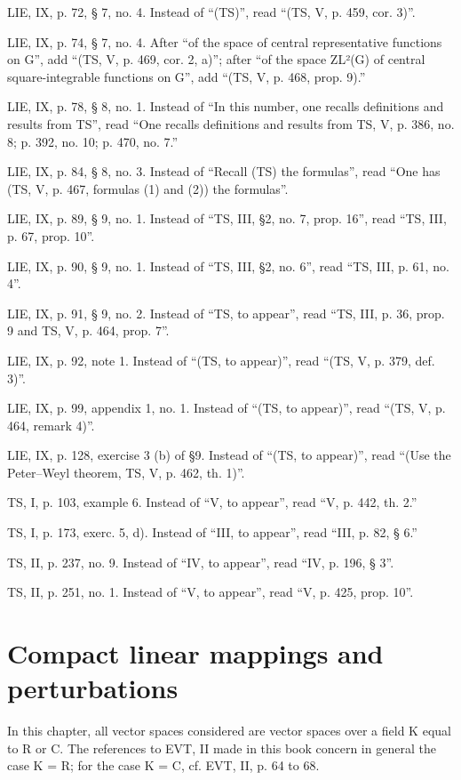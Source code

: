LIE, IX, p. 72, § 7, no. 4. Instead of “(TS)”, read “(TS, V, p. 459, cor. 3)”.

LIE, IX, p. 74, § 7, no. 4. After “of the space of central representative functions on G”, add “(TS, V, p. 469, cor. 2, a)”; after “of the space ZL²(G) of central square-integrable functions on G”, add “(TS, V, p. 468, prop. 9).”

LIE, IX, p. 78, § 8, no. 1. Instead of “In this number, one recalls definitions and results from TS”, read “One recalls definitions and results from TS, V, p. 386, no. 8; p. 392, no. 10; p. 470, no. 7.”

LIE, IX, p. 84, § 8, no. 3. Instead of “Recall (TS) the formulas”, read “One has (TS, V, p. 467, formulas (1) and (2)) the formulas”.

LIE, IX, p. 89, § 9, no. 1. Instead of “TS, III, §2, no. 7, prop. 16”, read “TS, III, p. 67, prop. 10”.

LIE, IX, p. 90, § 9, no. 1. Instead of “TS, III, §2, no. 6”, read “TS, III, p. 61, no. 4”.

LIE, IX, p. 91, § 9, no. 2. Instead of “TS, to appear”, read “TS, III, p. 36, prop. 9 and TS, V, p. 464, prop. 7”.

LIE, IX, p. 92, note 1. Instead of “(TS, to appear)”, read “(TS, V, p. 379, def. 3)”.

LIE, IX, p. 99, appendix 1, no. 1. Instead of “(TS, to appear)”, read “(TS, V, p. 464, remark 4)”.

LIE, IX, p. 128, exercise 3 (b) of §9. Instead of “(TS, to appear)”, read “(Use the Peter--Weyl theorem, TS, V, p. 462, th. 1)”.

TS, I, p. 103, example 6. Instead of “V, to appear”, read “V, p. 442, th. 2.”

TS, I, p. 173, exerc. 5, d). Instead of “III, to appear”, read “III, p. 82, § 6.”

TS, II, p. 237, no. 9. Instead of “IV, to appear”, read “IV, p. 196, § 3”.

TS, II, p. 251, no. 1. Instead of “V, to appear”, read “V, p. 425, prop. 10”.

\chapter{Compact linear mappings and perturbations}
\setcounter{exercisepar}{0}

In this chapter, all vector spaces considered are vector spaces over a field K equal to R or C. The references to EVT, II made in this book concern in general the case K = R; for the case K = C, cf. EVT, II, p. 64 to 68.

